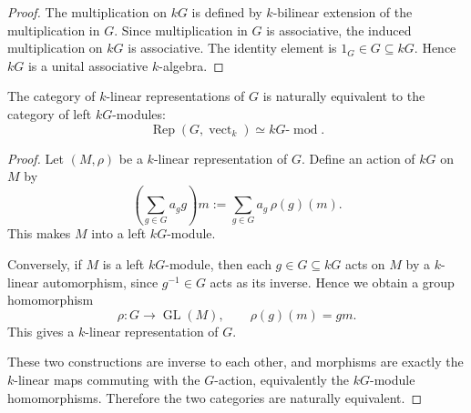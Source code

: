 \begin{proof}
    The multiplication on \(kG\) is defined by \(k\)-bilinear extension of the
    multiplication in \(G\). Since multiplication in \(G\) is associative, the
    induced multiplication on \(kG\) is associative. The identity element is
    \(1_G\in G\subseteq kG\). Hence \(kG\) is a unital associative \(k\)-algebra.
\end{proof}

\begin{theorem}
    The category of \(k\)-linear representations of \(G\) is naturally equivalent
    to the category of left \(kG\)-modules:
    \[
        \operatorname{Rep}(G,\operatorname{vect}_k)
        \simeq
        kG\text{-}\operatorname{mod}.
    \]
\end{theorem}

\begin{proof}
    Let \((M,\rho)\) be a \(k\)-linear representation of \(G\). Define an action of
    \(kG\) on \(M\) by
    \[
        \left(\sum_{g\in G} a_g g\right)m
        :=
        \sum_{g\in G} a_g\,\rho(g)(m).
    \]
    This makes \(M\) into a left \(kG\)-module.

    Conversely, if \(M\) is a left \(kG\)-module, then each \(g\in G\subseteq kG\)
    acts on \(M\) by a \(k\)-linear automorphism, since \(g^{-1}\in G\) acts as its
    inverse. Hence we obtain a group homomorphism
    \[
        \rho:G\longrightarrow \operatorname{GL}(M),
        \qquad
        \rho(g)(m)=g m.
    \]
    This gives a \(k\)-linear representation of \(G\).

    These two constructions are inverse to each other, and morphisms are exactly
    the \(k\)-linear maps commuting with the \(G\)-action, equivalently the
    \(kG\)-module homomorphisms. Therefore the two categories are naturally
    equivalent.
\end{proof}


